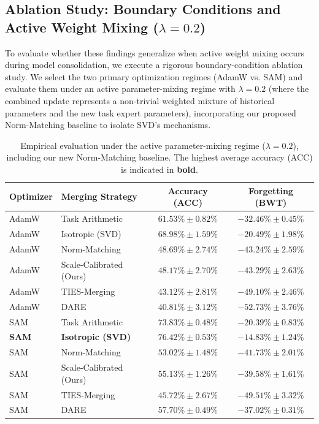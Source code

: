 \subsection{Ablation Study: Boundary Conditions and Active Weight Mixing ($\lambda = 0.2$)}
To evaluate whether these findings generalize when active weight mixing occurs during model consolidation, we execute a rigorous boundary-condition ablation study. We select the two primary optimization regimes (AdamW vs. SAM) and evaluate them under an active parameter-mixing regime with $\lambda = 0.2$ (where the combined update represents a non-trivial weighted mixture of historical parameters and the new task expert parameters), incorporating our proposed Norm-Matching baseline to isolate SVD's mechanisms.

\begin{table}[ht]
  \caption{Empirical evaluation under the active parameter-mixing regime ($\lambda = 0.2$), including our new Norm-Matching baseline. The highest average accuracy (ACC) is indicated in \textbf{bold}.}
  \label{tab:lambda_results}
  \vskip 0.15in
  \begin{center}
  \begin{small}
  \begin{sc}
  \setlength{\tabcolsep}{12pt}
  \begin{tabular}{llcc}
    \toprule
    Optimizer & Merging Strategy & Accuracy (ACC) & Forgetting (BWT) \\
    \midrule
    AdamW & Task Arithmetic & $61.53\% \pm 0.82\%$ & $-32.46\% \pm 0.45\%$ \\
    AdamW & Isotropic (SVD) & $68.98\% \pm 1.59\%$ & $-20.49\% \pm 1.98\%$ \\
    AdamW & Norm-Matching & $48.69\% \pm 2.74\%$ & $-43.24\% \pm 2.59\%$ \\
    AdamW & Scale-Calibrated (Ours) & $48.17\% \pm 2.70\%$ & $-43.29\% \pm 2.63\%$ \\
    AdamW & TIES-Merging & $43.12\% \pm 2.81\%$ & $-49.10\% \pm 2.46\%$ \\
    AdamW & DARE & $40.81\% \pm 3.12\%$ & $-52.73\% \pm 3.76\%$ \\
    \midrule
    SAM & Task Arithmetic & $73.83\% \pm 0.48\%$ & $-20.39\% \pm 0.83\%$ \\
    \textbf{SAM} & \textbf{Isotropic (SVD)} & \textbf{$76.42\% \pm 0.53\%$} & \textbf{$-14.83\% \pm 1.24\%$} \\
    SAM & Norm-Matching & $53.02\% \pm 1.48\%$ & $-41.73\% \pm 2.01\%$ \\
    SAM & Scale-Calibrated (Ours) & $55.13\% \pm 1.26\%$ & $-39.58\% \pm 1.61\%$ \\
    SAM & TIES-Merging & $45.72\% \pm 2.67\%$ & $-49.51\% \pm 3.32\%$ \\
    SAM & DARE & $57.70\% \pm 0.49\%$ & $-37.02\% \pm 0.31\%$ \\
    \bottomrule
  \end{tabular}
  \end{sc}
  \end{small}
  \end{center}
  \vskip -0.1in
\end{table}

